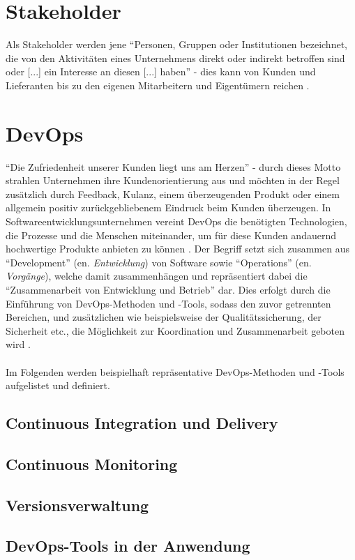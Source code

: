 \section{Stakeholder}
Als Stakeholder werden jene \enquote{Personen, Gruppen oder Institutionen bezeichnet, die von den Aktivitäten eines Unternehmens 
direkt oder indirekt betroffen sind oder [...] ein Interesse an diesen [...] haben} \cite{Fleig:2016aa} - dies kann von Kunden 
und Lieferanten bis zu den eigenen Mitarbeitern und Eigentümern reichen \cite{Fleig:2016aa}. 

\section{DevOps}
\enquote{Die Zufriedenheit unserer Kunden liegt uns am Herzen} - durch dieses Motto strahlen Unternehmen ihre Kundenorientierung aus und möchten in der Regel zusätzlich durch Feedback, Kulanz, einem überzeugenden Produkt
oder einem allgemein positiv zurückgebliebenem Eindruck beim Kunden überzeugen. In Softwareentwicklungsunternehmen vereint DevOps die benötigten Technologien, die Prozesse und die Menschen miteinander, um für diese Kunden 
andauernd hochwertige Produkte anbieten zu können \cite{MSAzure:2020aa}. Der Begriff setzt sich zusammen aus \enquote{Development} (en. \textit{Entwicklung}) von Software sowie \enquote{Operations} (en. \textit{Vorgänge}), welche damit zusammenhängen 
\cite{MSAzure:2020aa} und repräsentiert dabei die \enquote{Zusammenarbeit von Entwicklung und Betrieb} \cite{Hasselbring:2015aa} dar. Dies erfolgt durch die Einführung von DevOps-Methoden und -Tools, sodass den zuvor getrennten Bereichen, 
und zusätzlichen wie beispielsweise der Qualitätssicherung, der Sicherheit etc., die Möglichkeit zur Koordination und Zusammenarbeit geboten wird \cite{MSAzure:2020aa}. \\ \\
Im Folgenden werden beispielhaft repräsentative DevOps-Methoden und -Tools aufgelistet und definiert.

\subsection{Continuous Integration und Delivery}

\subsection{Continuous Monitoring}

\subsection{Versionsverwaltung}

\subsection{DevOps-Tools in der Anwendung}